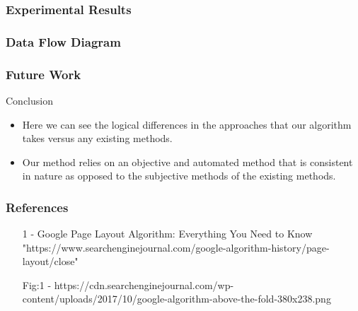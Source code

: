 \documentclass[11pt]{beamer}
\begin{document}
\begin{frame}
\frametitle{Experimental Results}
\end{frame}
\begin{frame}
\frametitle{Data Flow Diagram}
\end{frame}
\begin{frame}
\frametitle{Future Work}
\end{frame}
	\begin{frame}{Conclusion}
		\begin{itemize}
			\item Here we can see the logical differences in the approaches that our algorithm takes versus any existing methods.
			\item Our method relies on an objective and automated method that is consistent in nature as opposed to the subjective methods of the existing methods.
		\end{itemize}
	\end{frame}
	\begin{frame}
		\frametitle{\LARGE \textbf{References}}
		\begin{itemize}
			\item [1] - Google Page Layout Algorithm: Everything You Need to Know 
			"https://www.searchenginejournal.com/google-algorithm-history/page-layout/close"
			\item [Fig:1] - https://cdn.searchenginejournal.com/wp-content/uploads/2017/10/google-algorithm-above-the-fold-380x238.png
		\end{itemize}
	\end{frame}
\end{document}
